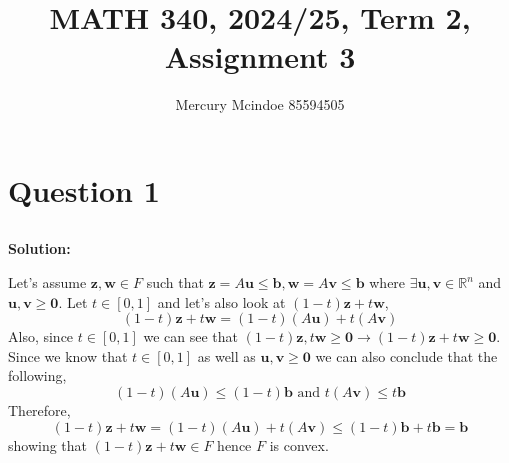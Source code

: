 \documentclass[11pt]{article}
\title{MATH 340, 2024/25, Term 2, Assignment 3}
\author{Mercury Mcindoe 85594505}
\newenvironment{solution}
  {\par\noindent\textbf{Solution:}\par}
  {\par}
\begin{document}
\maketitle 
\thispagestyle{empty}

\section*{Question 1}
\subsection{}
\begin{solution}
  Let's assume $\textbf{z},\textbf{w} \in F$ such that $\textbf{z}=A\textbf{u} \le \textbf{b}, \textbf{w}=A\textbf{v} \le \textbf{b}$ where $\exists \textbf{u},\textbf{v} \in \mathbb{R}^n$ and $\textbf{u},\textbf{v} \ge \mathbf{0}$.
  Let $t \in [0,1]$ and let's also look at $(1-t)\textbf{z} + t\textbf{w}$,
  \[
    (1-t)\textbf{z}+t\textbf{w}= (1-t)(A\textbf{u}) + t(A\textbf{v}) 
  \]
  Also, since $t \in [0,1]$ we can see that $(1-t)\textbf{z},t\textbf{w}\ge \textbf{0} \to (1-t)\textbf{z} + t\textbf{w} \ge \textbf{0}$.
  Since we know that $t\in[0,1]$ as well as $\textbf{u},\textbf{v} \ge \mathbf{0}$ we can also conclude that the following,
  \[
    (1-t)(A\textbf{u}) \le (1-t)\textbf{b} \text{ and } t(A\textbf{v}) \le t\textbf{b} 
  \]
  Therefore,
  \[
    (1-t)\textbf{z} + t\textbf{w} = (1-t)(A\textbf{u}) + t(A\textbf{v}) \le (1-t)\textbf{b} + t\textbf{b} = \textbf{b}
  \]
  showing that $(1-t)\textbf{z} + t\textbf{w} \in F$ hence $F$ is convex.
\end{solution}
\end{document}
